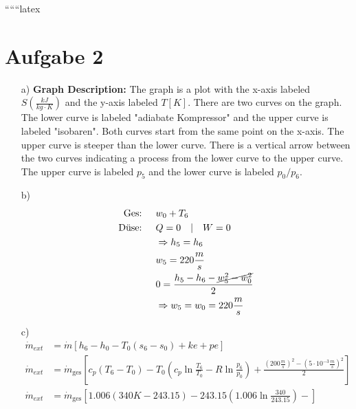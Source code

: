 
``````latex


\section*{Aufgabe 2}

\begin{itemize}
    \item[a)] \textbf{Graph Description:} The graph is a plot with the x-axis labeled $S \left( \frac{kJ}{kg \cdot K} \right)$ and the y-axis labeled $T \left[ K \right]$. There are two curves on the graph. The lower curve is labeled "adiabate Kompressor" and the upper curve is labeled "isobaren". Both curves start from the same point on the x-axis. The upper curve is steeper than the lower curve. There is a vertical arrow between the two curves indicating a process from the lower curve to the upper curve. The upper curve is labeled $p_5$ and the lower curve is labeled $p_0/p_6$.
\end{itemize}

\begin{itemize}
    \item[b)] 
    \begin{align*}
        \text{Ges: } & \quad w_0 + T_6 \\
        \text{Düse: } & \quad Q = 0 \quad | \quad W = 0 \\
        & \quad \Rightarrow h_5 = h_6 \\
        & \quad w_5 = 220 \frac{m}{s} \\
        & \quad 0 = \frac{h_5 - h_6 - \cancel{w_5^2 - w_0^2}}{2} \\
        & \quad \Rightarrow w_5 = w_0 = 220 \frac{m}{s}
    \end{align*}
\end{itemize}

\begin{itemize}
    \item[c)] 
    \begin{align*}
        \dot{m}_{ext} &= \dot{m} \left[ h_6 - h_0 - T_0 (s_6 - s_0) + ke + pe \right] \\
        \dot{m}_{ext} &= \dot{m}_{\text{ges}} \left[ c_p (T_6 - T_0) - T_0 \left( c_p \ln \frac{T_6}{T_0} - R \ln \frac{p_6}{p_0} \right) + \frac{\left( 200 \frac{m}{s} \right)^2 - \left( 5 \cdot 10^{-3} \frac{m}{s} \right)^2}{2} \right] \\
        \dot{m}_{ext} &= \dot{m}_{\text{ges}} \left[ 1.006 \left( 340 K - 243.15 \right) - 243.15 \left( 1.006 \ln \frac{340}{243.15} \right) - \right]
    \end{align*}
\end{itemize}

